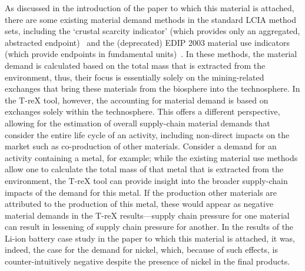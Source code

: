 \documentclass{article}
\begin{document}
As discussed in the introduction of the paper to which this material is attached, there are some existing material demand methods in the standard LCIA method sets, including the `crustal scarcity indicator' (which provides only an aggregated, abstracted endpoint)~\citep{arvidsson2020csi} and the (deprecated) EDIP 2003 material use indicators (which provide endpoints in fundamental units)~\citep{hauschild2003edip}. In these methods, the material demand is calculated based on the total mass that is extracted from the environment, thus, their focus is essentially solely on the mining-related exchanges that bring these materials from the biosphere into the technosphere. In the T-reX tool, however, the accounting for material demand is based on exchanges solely within the technosphere. This offers a different perspective, allowing for the estimation of overall supply-chain material demands that consider the entire life cycle of an activity, including non-direct impacts on the market such as co-production of other materials. Consider a demand for an activity containing a metal, for example; while the existing material use methods allow one to calculate the total mass of that metal that is extracted from the environment, the T-reX tool can provide insight into the broader supply-chain impacts of the demand for this metal. If the production other materials are attributed to the production of this metal, these would appear as negative material demands in the T-reX results---supply chain pressure for one material can result in lessening of supply chain pressure for another. In the results of the Li-ion battery case study in the paper to which this material is attached, it was, indeed, the case for the demand for nickel, which, because of such effects, is counter-intuitively negative despite the presence of nickel in the final products.
\end{document}
